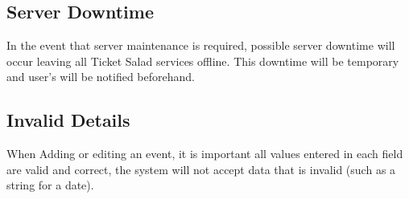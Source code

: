 \documentclass[11pt]{article}
\begin{document}
	\subsection{Server Downtime}
	In the event that server maintenance is required, possible server downtime will occur leaving all Ticket Salad 
	services offline. This downtime will be temporary and user's will be notified beforehand.
	\subsection{Invalid Details}
	When Adding or editing an event, it is important all values entered in each field are valid and correct, the system will not accept data that is invalid (such as a string for a date).
	
\end{document}
